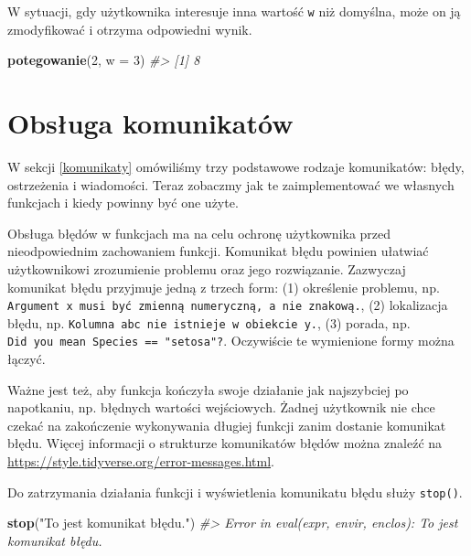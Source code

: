 \documentclass[paper=6in:9in,pagesize=pdftex,headinclude=on,footinclude=on,10pt]{scrbook}
\newenvironment{Shaded}{\begin{snugshade}}{\end{snugshade}}
\newcommand{\CommentTok}[1]{\textcolor[rgb]{0.56,0.35,0.01}{\textit{#1}}}
\newcommand{\DataTypeTok}[1]{\textcolor[rgb]{0.13,0.29,0.53}{#1}}
\newcommand{\DecValTok}[1]{\textcolor[rgb]{0.00,0.00,0.81}{#1}}
\newcommand{\KeywordTok}[1]{\textcolor[rgb]{0.13,0.29,0.53}{\textbf{#1}}}
\newcommand{\NormalTok}[1]{#1}
\newcommand{\StringTok}[1]{\textcolor[rgb]{0.31,0.60,0.02}{#1}}
\begin{document}
W sytuacji, gdy użytkownika interesuje inna wartość \texttt{w} niż domyślna, może on ją zmodyfikować i otrzyma odpowiedni wynik.

\begin{Shaded}
\begin{Highlighting}[]
\KeywordTok{potegowanie}\NormalTok{(}\DecValTok{2}\NormalTok{, }\DataTypeTok{w =} \DecValTok{3}\NormalTok{)}
\CommentTok{#> [1] 8}
\end{Highlighting}
\end{Shaded}

\hypertarget{obsluga-komunikatow}{%
\section{Obsługa komunikatów}\label{obsluga-komunikatow}}

W sekcji \ref{komunikaty} omówiliśmy trzy podstawowe rodzaje komunikatów: błędy, ostrzeżenia i wiadomości.
Teraz zobaczmy jak te zaimplementować we własnych funkcjach i kiedy powinny być one użyte.

Obsługa błędów w funkcjach ma na celu ochronę użytkownika przed nieodpowiednim zachowaniem funkcji.
Komunikat błędu powinien ułatwiać użytkownikowi zrozumienie problemu oraz jego rozwiązanie.
Zazwyczaj komunikat błędu przyjmuje jedną z trzech form: (1) określenie problemu, np. \texttt{Argument\ \textquotesingle{}x\textquotesingle{}\ musi\ być\ zmienną\ numeryczną,\ a\ nie\ znakową.}, (2) lokalizacja błędu, np. \texttt{Kolumna\ \textquotesingle{}abc\textquotesingle{}\ nie\ istnieje\ w\ obiekcie\ \textquotesingle{}y\textquotesingle{}.}, (3) porada, np. \texttt{Did\ you\ mean\ \textquotesingle{}Species\ ==\ "setosa"\textquotesingle{}?}.
Oczywiście te wymienione formy można łączyć.

Ważne jest też, aby funkcja kończyła swoje działanie jak najszybciej po napotkaniu, np. błędnych wartości wejściowych.
Żadnej użytkownik nie chce czekać na zakończenie wykonywania długiej funkcji zanim dostanie komunikat błędu.
Więcej informacji o strukturze komunikatów błędów można znaleźć na \url{https://style.tidyverse.org/error-messages.html}.

Do zatrzymania działania funkcji i wyświetlenia komunikatu błędu służy \texttt{stop()}.

\begin{Shaded}
\begin{Highlighting}[]
\KeywordTok{stop}\NormalTok{(}\StringTok{"To jest komunikat błędu."}\NormalTok{)}
\CommentTok{#> Error in eval(expr, envir, enclos): To jest komunikat błędu.}
\end{Highlighting}
\end{Shaded}
\end{document}
